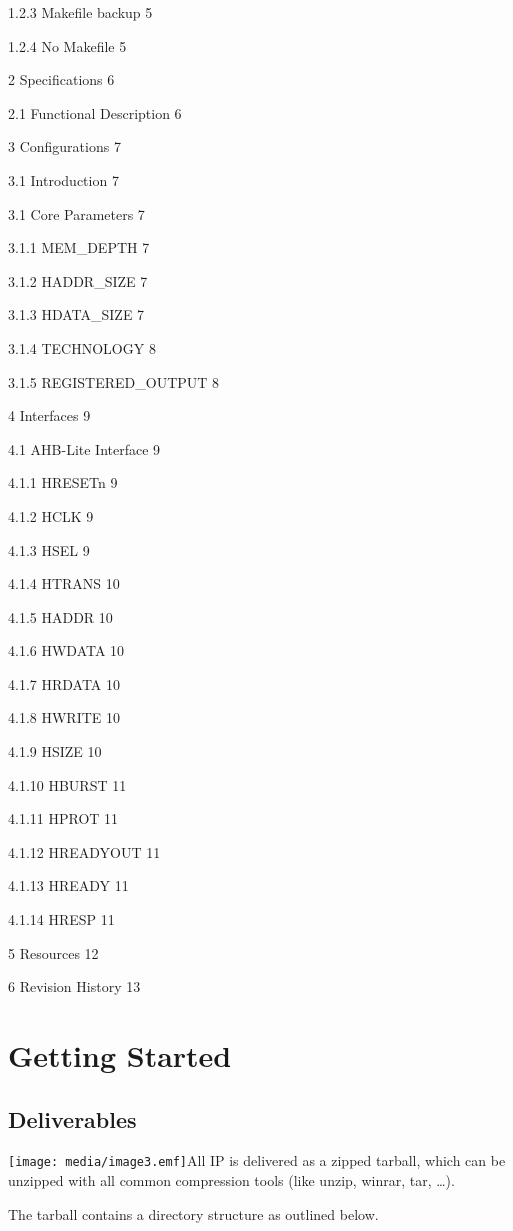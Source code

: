 1.2.3 Makefile backup 5

1.2.4 No Makefile 5

2 Specifications 6

2.1 Functional Description 6

3 Configurations 7

3.1 Introduction 7

3.1 Core Parameters 7

3.1.1 MEM\_DEPTH 7

3.1.2 HADDR\_SIZE 7

3.1.3 HDATA\_SIZE 7

3.1.4 TECHNOLOGY 8

3.1.5 REGISTERED\_OUTPUT 8

4 Interfaces 9

4.1 AHB-Lite Interface 9

4.1.1 HRESETn 9

4.1.2 HCLK 9

4.1.3 HSEL 9

4.1.4 HTRANS 10

4.1.5 HADDR 10

4.1.6 HWDATA 10

4.1.7 HRDATA 10

4.1.8 HWRITE 10

4.1.9 HSIZE 10

4.1.10 HBURST 11

4.1.11 HPROT 11

4.1.12 HREADYOUT 11

4.1.13 HREADY 11

4.1.14 HRESP 11

5 Resources 12

6 Revision History 13

\section{Getting Started}\label{getting-started}

\subsection{Deliverables}\label{deliverables}

\texttt{[image: media/image3.emf]}All
IP is delivered as a zipped tarball, which can be unzipped with all
common compression tools (like unzip, winrar, tar, \ldots{}).

The tarball contains a directory structure as outlined below.


